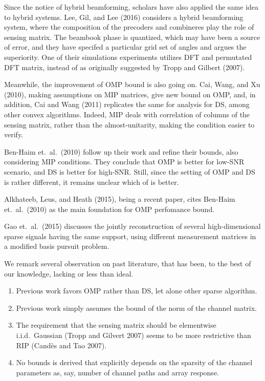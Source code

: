 Since the notice of hybrid beamforming, scholars have also applied the same idea to hybrid systems.
Lee, Gil, and Lee (2016) considers a hybrid beamforming system, where the composition of the precoders and combineres play the role of sensing matrix.
The beambook phase is quantized, which may have been a source of error, and they have specifed a particular grid set of angles and argues the superiority.
One of their simulations experiments utilizes DFT and permutated DFT matrix, instead of as originally suggested by Tropp and Gilbert (2007).

Meanwhile, the improvement of OMP bound is also going on.
Cai, Wang, and Xu (2010), making assumptions on MIP matrices, give new bound on OMP, and, in addition, Cai and Wang (2011) replicates the same for analysis for DS, among other convex algorithms.
Indeed, MIP deals with correlation of columns of the sensing matrix, rather than the almost-unitarity, making the condition easier to verify.

Ben-Haim et.\ al.\ (2010) follow up their work and refine their bounds, also considering MIP conditions.
They conclude that OMP is better for low-SNR scenario, and DS is better for high-SNR.
Still, since the setting of OMP and DS is rather different, it remains unclear which of is better.

Alkhateeb, Leus, and Heath (2015), being a recent paper, cites Ben-Haim et.\ al.\ (2010) as the main foundation for OMP perfomance bound.

Gao et.\ al.\ (2015) discusses the jointly reconstruction of several high-dimensional sparse signals having the same support, using different measurement matrices in a modified basis pursuit problem.

We remark several observation on past literature, that has been, to the best of our knowledge, lacking or less than ideal.

\begin{enumerate}
\item Previous work favors OMP rather than DS, let alone other sparse algorithm.
\item Previous work simply assumes the bound of the norm of the channel matrix.
\item The requirement that the sensing matrix should be elementwise i.i.d.\ Gaussian (Tropp and Gilvert 2007) seems to be more restrictive than RIP (Cand\`es and Tao 2007).
\item No bounds is derived that explicitly depends on the sparsity of the channel parameters as, say, number of channel paths and array response.
\end{enumerate}

